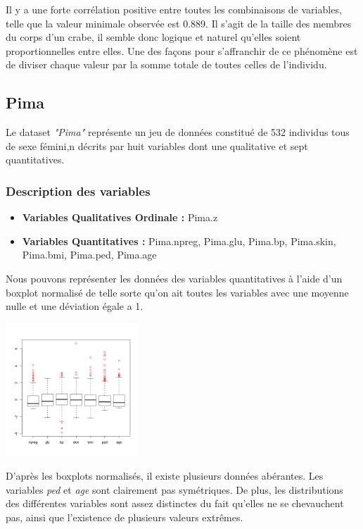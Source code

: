 \documentclass[10pt]{article}
\begin{document}
	Il y a une forte corrélation positive entre toutes les combinaisons de variables, telle que la valeur minimale observée est 0.889. 
	Il s'agit de la taille des membres du corps d'un crabe, il semble donc logique et naturel qu'elles soient proportionnelles entre elles.
	Une des façons pour s'affranchir de ce phénomène est de diviser chaque valeur par la somme totale de toutes celles de l'individu.
	
\subsection{Pima}
Le dataset \textit{"Pima"} représente un jeu de données constitué de 532 individus tous de sexe fémini,n décrits par huit variables dont une qualitative et sept quantitatives.

\subsubsection{Description des variables}

\begin{itemize}
	\item \textbf{Variables Qualitatives Ordinale :}  Pima.z
	\item \textbf{Variables Quantitatives : } Pima.npreg, Pima.glu, Pima.bp, Pima.skin, Pima.bmi, Pima.ped, Pima.age
\end{itemize}

Nous pouvons représenter les données des variables quantitatives à l'aide d'un boxplot normalisé de telle sorte qu'on ait toutes les variables avec une moyenne nulle et une déviation égale a 1.
\begin{center}
	\includegraphics[width=50mm]{Figures/Pima/boxplot_norm_Pimaquant.png}
	\label{fig:boxplot_norm_pima_quantitatives}
\end{center}

D'après les boxplots normalisés, il existe plusieurs données abérantes. Les variables \textit{ped} et \textit{age} sont clairement pas symétriques. De plus, les distributions des différentes variables sont assez distinctes du fait qu'elles ne se chevauchent pas, ainsi que l'existence de plusieurs valeurs extrêmes.
\end{document}
